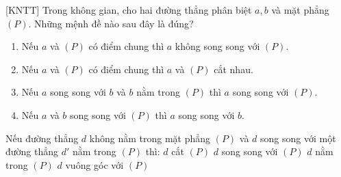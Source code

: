 \begin{bt}%
	[KNTT]
	Trong không gian, cho hai đường thẳng phân biệt $a, b$ và mặt phẳng $(P)$. Những mệnh đề nào sau đây là đúng?
	\begin{enumerate} 
		\item[a)] Nếu $ a $ và $(P)$ có điểm chung thì $ a $ không song song với $(P)$.
		\item[b)] Nếu $ a $ và $(P)$ có điểm chung thì $ a $ và $(P)$ cắt nhau.
		\item[c)] Nếu $ a $ song song với $ b$ và $ b$ nằm trong $(P)$ thì $ a $ song song với $(P)$.
		\item[d)] Nếu $ a$ và $ b$ song song với $(P)$ thì $ a $ song song với $ b$.
	\end{enumerate}
\end{bt}

\begin{ex}%
	Nếu đường thẳng $d$ không nằm trong mặt phẳng $(P)$ và $d$ song song với một đường thẳng $d'$ nằm trong $(P)$ thì:
	\choice
	{$d$ cắt $(P)$}
	{\True $d$ song song với $(P)$}
	{$d$ nằm trong $(P)$}
	{$d$ vuông góc với $(P)$}
\end{ex}
